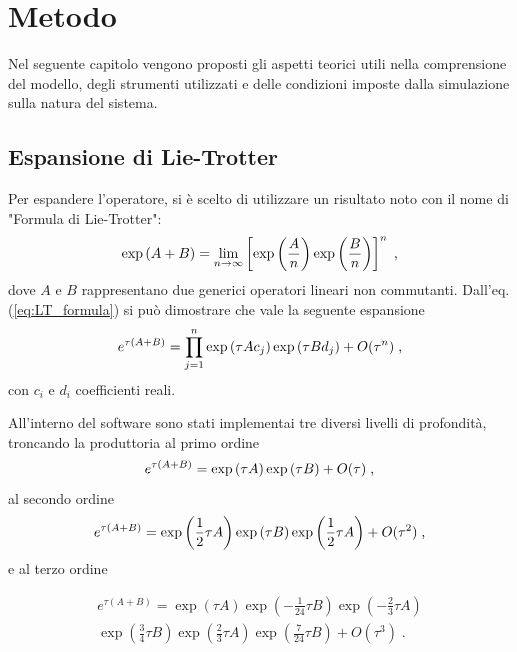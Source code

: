 \chapter{Metodo}
\label{ch:teoria}

Nel seguente capitolo vengono proposti gli aspetti teorici utili nella comprensione del modello, degli strumenti utilizzati e delle condizioni imposte dalla simulazione sulla natura del sistema.

\section{Espansione di Lie-Trotter}
\label{sec:LT}

Per espandere l'operatore, si è scelto di utilizzare un risultato noto con il nome di "Formula di Lie-Trotter":
\begin{equation}
    \centering
     \exp \left({A} + {B}\right) = \lim_{n\to\infty } \left[  \exp \left(\frac{A}{n}\right)  \exp \left(\frac{B}{n}\right) \right] ^{n} \; \text{,}
    \label{eq:LT_formula}
\end{equation}
dove $A$ e $B$ rappresentano due generici operatori lineari non commutanti.
Dall'eq. (\ref{eq:LT_formula}) si può dimostrare che vale la seguente espansione 
\begin{equation}
    \centering
    e^{\tau ({A} + {B})}
    = \prod _{j=1} ^{n}  \exp \left( \tau A c_{j}\right)   \exp \left(\tau B d_{j}\right) + O(\tau^{n}) \; \text{,}
    \label{eq:LT_expantion}
\end{equation}
con $c_{i}$ e $d_{i}$ coefficienti reali.

All'interno del software sono stati implementai tre diversi livelli di profondità, troncando la produttoria al primo ordine
\begin{equation}
    \centering
    e^{\tau ({A} + {B})} 
    =  \exp \left( \tau A \right)   \exp \left(\tau B \right) + O(\tau) \; \text{,}
    \label{eq:LT_1}
\end{equation}
al secondo ordine 
\begin{equation}
    \centering
    e^{\tau ({A} + {B})}
    =  \exp \left(\frac{1}{2} \tau A \right)   \exp \left(\tau B \right)   \exp \left(\frac{1}{2} \tau A \right) +  O(\tau^{2}) \; \text{,}
    \label{eq:LT_2}
\end{equation}
e al terzo ordine

\begin{multline}
    e^{\tau ({A} + {B})}
    =  \exp \left( \tau A \right)   \exp \left( - \frac{1}{24}  \tau B \right)  \exp \left( - \frac{2}{3} \tau A \right)   \\    \exp \left( \frac{3}{4} \tau B \right)  \exp \left( \frac{2}{3} \tau A \right)   \exp \left( \frac{7}{24} \tau B \right)   +  O(\tau^{3}) \; \text{.}
    \label{eq:LT_3}
\end{multline}

